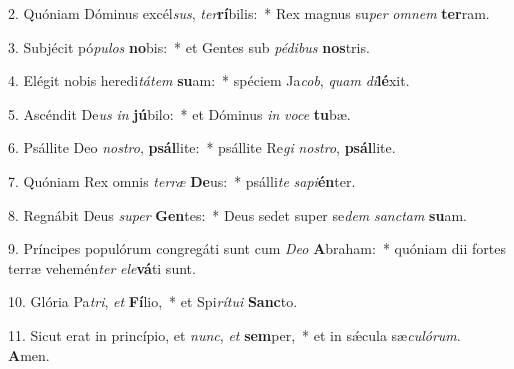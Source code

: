 2. Quóniam Dóminus excél\textit{sus}, \textit{ter}\textbf{rí}bilis:~*  Rex magnus su\textit{per} \textit{om}\textit{nem} \textbf{ter}ram.\

3. Subjécit pó\textit{pu}\textit{los} \textbf{no}bis:~*  et Gentes sub \textit{pé}\textit{di}\textit{bus} \textbf{nos}tris.\

4. Elégit nobis heredi\textit{tá}\textit{tem} \textbf{su}am:~*  spéciem Ja\textit{cob}, \textit{quam} \textit{di}\textbf{lé}xit.\

5. Ascéndit De\textit{us} \textit{in} \textbf{jú}bilo:~*  et Dóminus \textit{in} \textit{vo}\textit{ce} \textbf{tu}bæ.\

6. Psállite Deo \textit{nos}\textit{tro}, \textbf{psál}lite:~*  psállite Re\textit{gi} \textit{nos}\textit{tro}, \textbf{psál}lite.\

7. Quóniam Rex omnis \textit{ter}\textit{ræ} \textbf{De}us:~*  psálli\textit{te} \textit{sa}\textit{pi}\textbf{én}ter.\

8. Regnábit Deus \textit{su}\textit{per} \textbf{Gen}tes:~*  Deus sedet super se\textit{dem} \textit{sanc}\textit{tam} \textbf{su}am.\

9. Príncipes populórum congregáti sunt cum \textit{De}\textit{o} \textbf{A}braham:~*  quóniam dii fortes terræ vehemén\textit{ter} \textit{e}\textit{le}\textbf{vá}ti sunt.\

10. Glória Pa\textit{tri}, \textit{et} \textbf{Fí}lio,~*  et Spi\textit{rí}\textit{tu}\textit{i} \textbf{Sanc}to.\

11. Sicut erat in princípio, et \textit{nunc}, \textit{et} \textbf{sem}per,~*  et in sǽcula sæ\textit{cu}\textit{ló}\textit{rum}. \textbf{A}men.\

